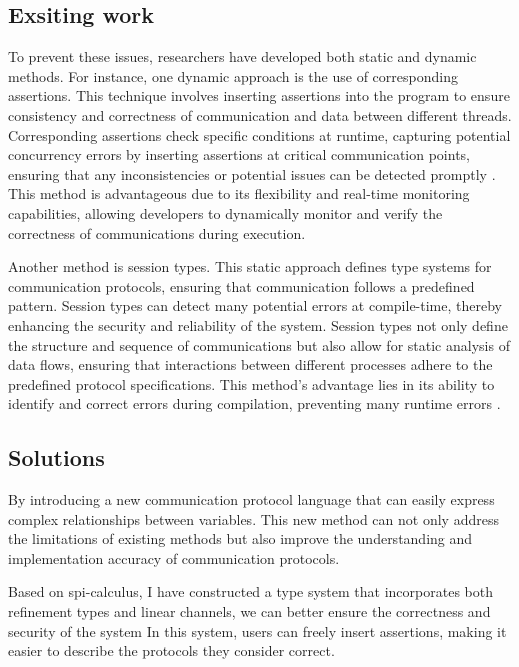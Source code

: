 \documentclass[master,english]{kuisthesis}
\theoremstyle{definition}
\begin{document}
\subsection{Exsiting work}
To prevent these issues, researchers have developed both static and dynamic methods. For instance, one dynamic approach is the use of corresponding assertions. This technique involves inserting assertions into the program to ensure consistency and correctness of communication and data between different threads. Corresponding assertions check specific conditions at runtime, capturing potential concurrency errors by inserting assertions at critical communication points, ensuring that any inconsistencies or potential issues can be detected promptly \cite{?}. This method is advantageous due to its flexibility and real-time monitoring capabilities, allowing developers to dynamically monitor and verify the correctness of communications during execution.

Another method is session types. This static approach defines type systems for communication protocols, ensuring that communication follows a predefined pattern. Session types can detect many potential errors at compile-time, thereby enhancing the security and reliability of the system. Session types not only define the structure and sequence of communications but also allow for static analysis of data flows, ensuring that interactions between different processes adhere to the predefined protocol specifications. This method's advantage lies in its ability to identify and correct errors during compilation, preventing many runtime errors \cite{?}.





\subsection{Solutions}

By introducing a new communication protocol language that can easily express complex relationships between variables. This new method can not only address the limitations of existing methods but also improve the understanding and implementation accuracy of communication protocols.

Based on spi-calculus, I have constructed a type system that incorporates both refinement types and linear channels, we can better ensure the correctness and security of the system In this system, users can freely insert assertions, making it easier to describe the protocols they consider correct.
\end{document}
